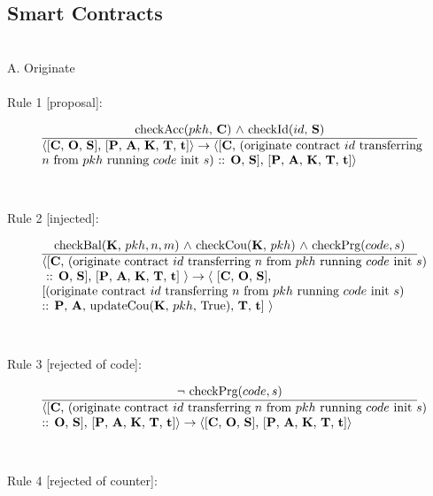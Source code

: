 \documentclass[a4paper]{llncs}
\begin{document}
\subsection{Smart Contracts}
~\\
A. Originate
~\\
~\\
Rule 1 [proposal]:

\begin{equation}{}
\frac{\text{checkAcc($pkh$, \ACCOUNTS) $\wedge$ checkId($id$, \CONTRACTS)}}{\parbox{4.2in}{\text{$\langle$[\ACCOUNTS, \OPERATIONS, \CONTRACTS], [\PENDING, \ACCEPTED, \MANAGERS, \CONTRACTORS, \TIME]$\rangle \rightarrow \langle$[\ACCOUNTS, (originate contract ${id}$ transferring} \\
  \text{${n}$ from ${pkh}$} \text{running ${code}$ init ${s}$) :: \OPERATIONS, \CONTRACTS], [\PENDING, \ACCEPTED, \MANAGERS, \CONTRACTORS, \TIME]$\rangle$}}} 
\end{equation}
~\\
~\\
Rule 2 [injected]:

\begin{equation}{}
\frac{\text{checkBal(\MANAGERS, $pkh, n, m$) $\wedge$ checkCou(\MANAGERS, $pkh$) $\wedge$ \text{checkPrg($code, s$)}}}{\parbox{4.2in}{\text{$\langle$[\ACCOUNTS, (originate contract ${id}$ transferring  ${n}$ from ${pkh}$ running ${code}$ init ${s}$)} \text{ :: \OPERATIONS, \CONTRACTS], [\PENDING, \ACCEPTED, \MANAGERS, \CONTRACTORS, \TIME] $\rangle \rightarrow \langle$ [\ACCOUNTS, \OPERATIONS, \CONTRACTS],} \text{[(originate contract ${id}$ transferring ${n}$ from ${pkh}$ running ${code}$ init ${s}$)} \text{:: \PENDING, \ACCEPTED, updateCou(\MANAGERS, $pkh$, True), \CONTRACTORS, \TIME] $\rangle$}}} 
\end{equation}
~\\
~\\
Rule 3 [rejected of code]:

\begin{equation}{}
\frac{\text{$\neg$ checkPrg($code, s$)}}{\parbox{4.2in}{\text{$\langle$[\ACCOUNTS, (originate contract ${id}$ transferring  ${n}$ from ${pkh}$ running ${code}$ init ${s}$)} \text{:: \OPERATIONS, \CONTRACTS], [\PENDING, \ACCEPTED, \MANAGERS, \CONTRACTORS, \TIME]$\rangle \rightarrow \langle$[\ACCOUNTS, \OPERATIONS, \CONTRACTS],} \text{[\PENDING, \ACCEPTED, \MANAGERS, \CONTRACTORS, \TIME]$\rangle$}}} 
\end{equation}
~\\
~\\
Rule 4 [rejected of counter]:
\end{document}
